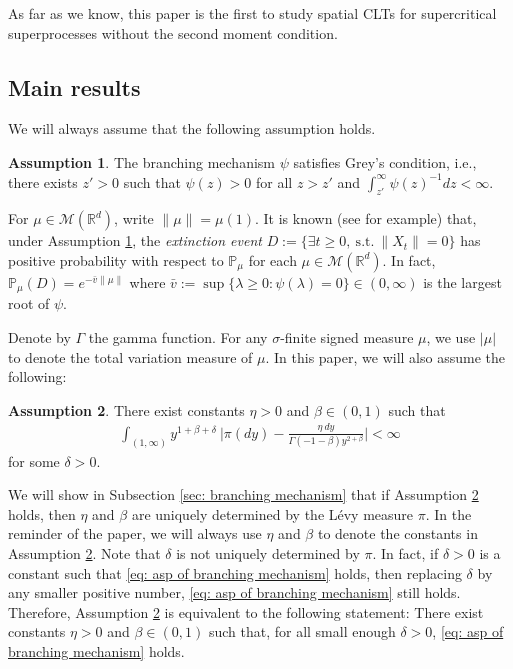 \documentclass[12pt,a4paper]{amsart}
\theoremstyle{plain}
\theoremstyle{definition}
\newtheorem{asp}{Assumption}
\numberwithin{equation}{section}
\begin{document}
As far as we know, this paper is the first to study spatial CLTs for supercritical superprocesses without the second moment condition.

\subsection{Main results}
\label{sec:I:R}
We will always assume that the following assumption holds.
\begin{asp}
  \label{asp: Greys condition}
  The branching mechanism $\psi$ satisfies Grey's condition, i.e., there exists $z' > 0$ such that $\psi(z) > 0$ for all $z>z'$ and  $\int_{z'}^\infty \psi(z)^{-1}dz < \infty$.
\end{asp}
For $\mu \in \mathcal M(\mathbb R^d)$, write $\|\mu\| = \mu(1)$.
It is known (see \cite[Theorems 12.5 \& 12.7]{Kyprianou2014Fluctuations} for example) that, under Assumption \ref{asp: Greys condition}, the \emph{extinction event} $D :=\{\exists t\geq 0,~\text{s.t.}~ \|X_t\| =0 \}$ has positive probability with respect to $\mathbb P_\mu$ for each  $\mu \in \mathcal M(\mathbb R^d)$.
In fact, $ \mathbb{P}_{\mu} (D) = e^{-\bar v \|\mu\|}$ where $ \bar v := \sup\{\lambda \geq 0: \psi(\lambda) = 0\} \in (0,\infty) $ is the largest root of $\psi$.

Denote by $\Gamma$ the gamma function.
For any $\sigma$-finite signed measure $\mu$, we use $|\mu|$ to denote the total variation measure of $\mu$.
In this paper, we will also assume the following:
\begin{asp}
  \label{asp: branching mechanism}
  There exist constants $\eta > 0$ and $\beta \in (0,1)$ such that
  \begin{align}
    \label{eq: asp of branching mechanism}
    \int_{(1,\infty)}y^{1+\beta +\delta}~\Big|\pi(dy)-\frac{\eta~dy}{\Gamma(-1-\beta)y^{2+\beta}}\Big| <\infty
  \end{align}
	for some $\delta > 0$.
\end{asp}
We will show in Subsection \ref{sec: branching mechanism} that if Assumption \ref{asp: branching mechanism} holds, then $\eta$ and $\beta$ are uniquely determined by the L\'evy measure $\pi$.
In the reminder of the paper, we will always use $\eta$ and $\beta$ to denote the constants in Assumption  \ref{asp: branching mechanism}.
	Note that $\delta$ is not uniquely determined by $\pi$.
	In fact, if $\delta>0$ is a constant such that \eqref{eq: asp of branching mechanism} holds, then replacing $\delta$ by any smaller positive number, \eqref{eq: asp of branching mechanism} still holds.
	Therefore, Assumption \ref{asp: branching mechanism} is equivalent to the following statement:
	There exist constants $\eta > 0$ and $\beta \in (0,1)$ such that, for all small enough $\delta>0$, \eqref{eq: asp of branching mechanism} holds.
\end{document}
